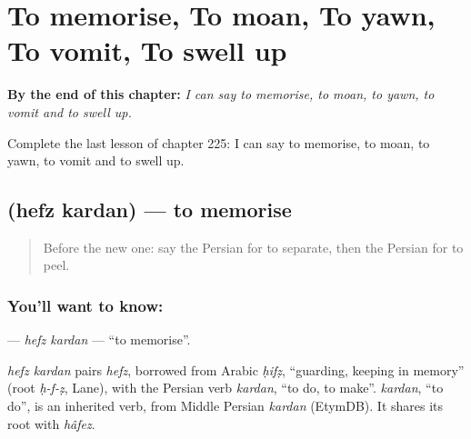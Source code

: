 
\chapter{To memorise, To moan, To yawn, To vomit, To swell up}
\label{ch:fa-to-memorise-to-moan-to-yawn-to-vomit-to-swell-up}

\begin{chapteropening}
\textbf{By the end of this chapter:} \emph{I can say to memorise, to moan, to yawn, to vomit and to swell up.}

Complete the last lesson of chapter 225: I can say to memorise, to moan, to yawn, to vomit and to swell up.
\end{chapteropening}

\section[\texorpdfstring{\fa{حفظ} \fa{کردن} (hefz kardan)}{حفظ کردن (hefz kardan)}]{  (hefz kardan) — to memorise}

\label{lesson:FA-C225-hefz-kardan}



\begin{quote}
Before the new one: say the Persian for to separate, then the Persian for to peel.
\end{quote}

\subsection*{You'll want to know:  }
\textbf{ } — \emph{hefz kardan} — \textquotedblleft{}to memorise\textquotedblright{}.

\begin{cousinweb}
\emph{hefz kardan} pairs \emph{hefz}, borrowed from Arabic \emph{ḥifẓ}, \textquotedblleft{}guarding, keeping in memory\textquotedblright{} (root \emph{ḥ-f-ẓ}, Lane), with the Persian verb \emph{kardan}, \textquotedblleft{}to do, to make\textquotedblright{}. \emph{kardan}, \textquotedblleft{}to do\textquotedblright{}, is an inherited verb, from Middle Persian \emph{kardan} (EtymDB). It shares its root with \emph{hâfez}.
\end{cousinweb}

